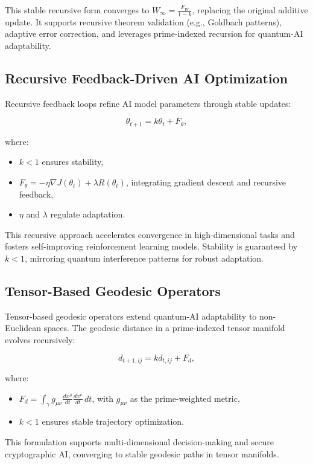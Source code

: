 \documentclass{article}
\theoremstyle{plain}
\begin{document}
This stable recursive form converges to \( W_\infty = \frac{F_W}{1 - k} \), replacing the original additive update. It supports recursive theorem validation (e.g., Goldbach patterns), adaptive error correction, and leverages prime-indexed recursion for quantum-AI adaptability.

\subsection{Recursive Feedback-Driven AI Optimization}
Recursive feedback loops refine AI model parameters through stable updates:

\[
\theta_{t+1} = k \theta_t + F_\theta,
\]

where:
\begin{itemize}
    \item \( k < 1 \) ensures stability,
    \item \( F_\theta = -\eta \nabla J(\theta_t) + \lambda R(\theta_t) \), integrating gradient descent and recursive feedback,
    \item \( \eta \) and \( \lambda \) regulate adaptation.
\end{itemize}

This recursive approach accelerates convergence in high-dimensional tasks and fosters self-improving reinforcement learning models. Stability is guaranteed by \( k < 1 \), mirroring quantum interference patterns for robust adaptation.

\subsection{Tensor-Based Geodesic Operators}
Tensor-based geodesic operators extend quantum-AI adaptability to non-Euclidean spaces. The geodesic distance in a prime-indexed tensor manifold evolves recursively:

\[
d_{t+1,ij} = k d_{t,ij} + F_d,
\]

where:
\begin{itemize}
    \item \( F_d = \int_{\gamma} g_{\mu\nu} \frac{dx^\mu}{dt} \frac{dx^\nu}{dt} \, dt \), with \( g_{\mu\nu} \) as the prime-weighted metric,
    \item \( k < 1 \) ensures stable trajectory optimization.
\end{itemize}

This formulation supports multi-dimensional decision-making and secure cryptographic AI, converging to stable geodesic paths in tensor manifolds.
\end{document}

